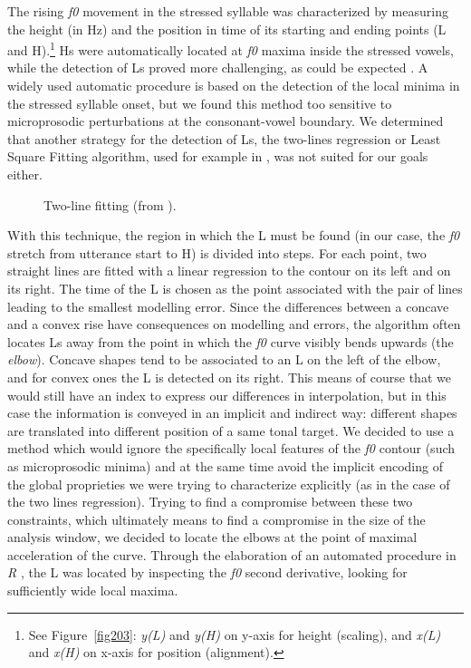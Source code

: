 The rising \textit{f0} movement in the stressed syllable was characterized by measuring the height (in Hz) and the position in time of its starting and ending points (L and H).\footnote{See Figure~\ref{fig203}: \textit{y(L)} and \textit{y(H)} on y-axis for height (scaling), and \textit{x(L)} and \textit{x(H)} on x-axis for position (alignment).} Hs were automatically located at \textit{f0} maxima inside the stressed vowels, while the detection of Ls proved more challenging, as could be expected \citep{delgiudice2007comparing,petrone2009tonal}. A widely used automatic procedure is based on the detection of the local minima in the stressed syllable onset, but we found this method too sensitive to microprosodic perturbations at the consonant-vowel boundary. We determined that another strategy for the detection of Ls, the two-lines regression or Least Square Fitting algorithm, used for example in \citet[92-93]{dimperio2000role}, was not suited for our goals either.

\begin{figure}
\centering
{}
\caption{Two-line fitting (from \citealt[95]{dimperio2000role}).}
\label{fig204}\end{figure}

With this technique, the region in which the L must be found (in our case, the \textit{f0} stretch from utterance start to H) is divided into steps. For each point, two straight lines are fitted with a linear regression to the contour on its left and on its right. The time of the L is chosen as the point associated with the pair of lines leading to the smallest modelling error. Since the differences between a concave and a convex rise have consequences on modelling and errors, the algorithm often locates Ls away from the point in which the \textit{f0} curve visibly bends upwards (the \textit{elbow}). Concave shapes tend to be associated to an L on the left of the elbow, and for convex ones the L is detected on its right. This means of course that we would still have an index to express our differences in interpolation, but in this case the information is conveyed in an implicit and indirect way: different shapes are translated into different position of a same tonal target.
We decided to use a method which would ignore the specifically local features of the \textit{f0} contour (such as microprosodic minima) and at the same time avoid the implicit encoding of the global proprieties we were trying to characterize explicitly (as in the case of the two lines regression). Trying to find a compromise between these two constraints, which ultimately means to find a compromise in the size of the analysis window, we decided to locate the elbows at the point of maximal acceleration of the curve. Through the elaboration of an automated procedure in \textit{R} \citep{r2008r}, the L was located by inspecting the \textit{f0} second derivative, looking for sufficiently wide local maxima.

